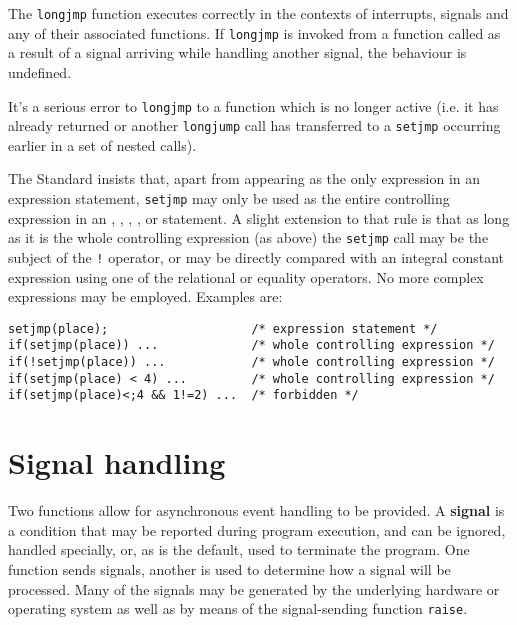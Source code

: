   The \texttt{longjmp} function executes correctly in the  contexts  of
   interrupts,  signals  and any of their associated functions.  If
   \texttt{longjmp} is invoked from a function called as a result  of
   a   signal  arriving  while  handling  another  signal,  the behaviour is
   undefined.


  It's a serious error to \texttt{longjmp} to a function  which  is  no
   longer  active  (i.e.  it  has  already  returned or another
   \texttt{longjump} call has transferred to a \texttt{setjmp}
   occurring  earlier in a set of nested calls).


  The Standard insists that, apart from appearing as the  only expression
   in  an  expression statement, \texttt{setjmp} may only be used as the
   entire controlling expression in an \kif, \switch,
   \kdo, \while,  or  \for{}  statement.
   A slight extension to that rule is  that  as  long  as  it  is  the  whole
   controlling expression  (as above) the \texttt{setjmp} call may be the
   subject of the \texttt{!}   operator,  or  may  be  directly  compared
   with  an integral  constant expression using one of the relational or
   equality operators.  No  more  complex  expressions  may  be employed.
   Examples are:


  \begin{Verbatim}
setjmp(place);                    /* expression statement */
if(setjmp(place)) ...             /* whole controlling expression */
if(!setjmp(place)) ...            /* whole controlling expression */
if(setjmp(place) < 4) ...         /* whole controlling expression */
if(setjmp(place)<;4 && 1!=2) ...  /* forbidden */
\end{Verbatim}

 
        \section{Signal handling}
        

  

  Two functions allow for asynchronous event handling to be provided.
   A \textbf{signal} is a condition that may be reported during program
   execution, and can be ignored, handled specially, or, as is the default,
   used to terminate the program.  One function sends signals, another is used
   to determine how a signal will be processed. Many of the signals may be
   generated by the underlying hardware or operating system as well as by means
   of the signal-sending function \texttt{raise}.


